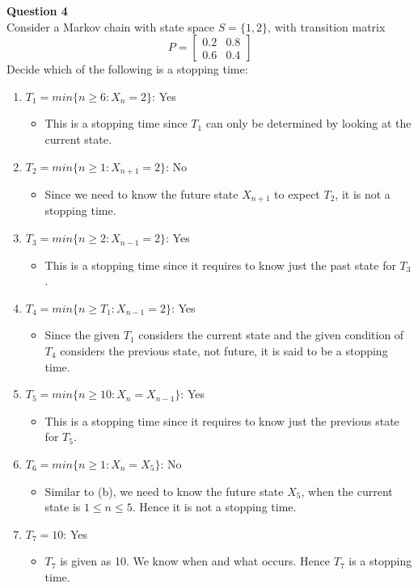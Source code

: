 \documentclass[12pt]{article}
\begin{document}
\newpage
\noindent
\textbf{Question 4}\\
Consider a Markov chain with state space $S = \{1, 2\}$, with transition matrix
$$
P=\begin{bmatrix}
0.2&0.8\\
0.6&0.4
\end{bmatrix}
$$
Decide which of the following is a stopping time:
\begin{enumerate}[label=(\alph*)]
    \item $T_1 = min\{n\ge 6: X_n = 2\}$: Yes
        \begin{itemize}
            \item This is a stopping time since $T_1$ can only be determined by looking at the current state.
        \end{itemize}
    \item $T_2 = min\{n\ge 1: X_{n+1} = 2\}$: No
        \begin{itemize}
        \item Since we need to know the future state $X_{n+1}$ to expect $T_2$, it is not a stopping time.
        \end{itemize}
    \item $T_3 = min\{n\ge 2: X_{n-1} = 2\}$: Yes
        \begin{itemize}
            \item This is a stopping time since it requires to know just the past state for $T_3$.
        \end{itemize}
    \item $T_4 = min\{n\ge T_1: X_{n-1} = 2\}$: Yes
        \begin{itemize}
            \item Since the given $T_1$ considers the current state and the given condition of $T_4$ considers the previous state, not future, it is said to be a stopping time.
        \end{itemize}
    \item $T_5 = min\{n\ge 10: X_n = X_{n-1}\}$: Yes
        \begin{itemize}
            \item This is a stopping time since it requires to know just the previous state for $T_5$.
        \end{itemize}
    \item $T_6 = min\{n\ge 1: X_n = X_5\}$: No
        \begin{itemize}
            \item Similar to (b), we need to know the future state $X_5$, when the current state is $1\le n \le 5$. Hence it is not a stopping time.
        \end{itemize}
    \item $T_7 = 10$: Yes
        \begin{itemize}
            \item $T_7$ is given as 10. We know when and what occurs. Hence $T_7$ is a stopping time.
        \end{itemize}
\end{enumerate}
\end{document}
